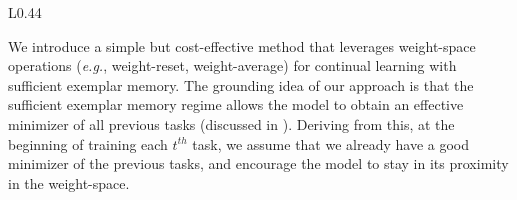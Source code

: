 


  \begin{wrapfigure}{L}{0.44\textwidth}
    \begin{minipage}{0.44\textwidth}
    

    \end{minipage}
  \end{wrapfigure}

We introduce a simple but cost-effective method that leverages weight-space operations (\textit{e.g.}, weight-reset, weight-average) for continual learning with sufficient exemplar memory. 
The grounding idea of our approach is that the sufficient exemplar memory regime allows the model to obtain an effective minimizer of all previous tasks (discussed in ). Deriving from this, at the beginning of training each  $t^{th}$ task, we assume that we already have a good minimizer of the previous tasks, and encourage the model to stay in its proximity in the weight-space. 

